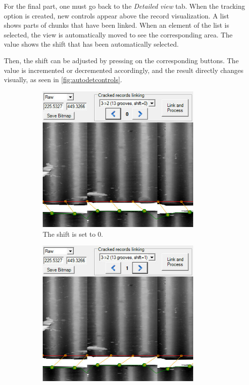For the final part, one must go back to the \emph{Detailed view} tab. When the tracking option is created, new controls appear above the record visualization. A list shows parts of chunks that have been linked. When an element of the list is selected, the view is automatically moved to see the corresponding area. The value shows the shift that has been automatically selected.

Then, the shift can be adjusted by pressing on the corresponding buttons. The value is incremented or decremented accordingly, and the result directly changes visually, as seen in \autoref{fig:autodetcontrols}.

\begin{figure}[!ht]
\centering
    \begin{subfigure}[t]{0.45\textwidth}
    \centering
    \includegraphics[width=0.9\textwidth]{images/auto-det-controls-1}
    \caption{The shift is set to 0.}
    \label{fig:autodetcontrols1}
    \end{subfigure}
    \begin{subfigure}[t]{0.45\textwidth}
    \centering
    \includegraphics[width=0.9\textwidth]{images/auto-det-controls-2}

\end{subfigure}
\end{figure}
